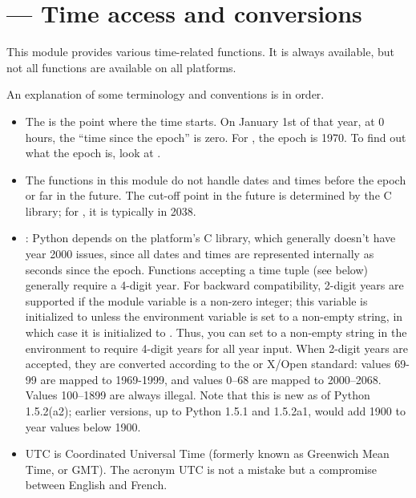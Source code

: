 \section{ ---
         Time access and conversions}



This module provides various time-related functions.
It is always available, but not all functions are available
on all platforms.

An explanation of some terminology and conventions is in order.

\begin{itemize}

\item
The  is the point where the time starts.  On
January 1st of that year, at 0 hours, the ``time since the epoch'' is
zero.  For \UNIX{}, the epoch is 1970.  To find out what the epoch is,
look at .

\item
The functions in this module do not handle dates and times before the
epoch or far in the future.  The cut-off point in the future is
determined by the C library; for \UNIX{}, it is typically in
2038.

\item
{}:  Python
depends on the platform's C library, which generally doesn't have year
2000 issues, since all dates and times are represented internally as
seconds since the epoch.  Functions accepting a time tuple (see below)
generally require a 4-digit year.  For backward compatibility, 2-digit
years are supported if the module variable  is a
non-zero integer; this variable is initialized to  unless the
environment variable  is set to a non-empty string,
in which case it is initialized to .  Thus, you can set
 to a non-empty string in the environment to require 4-digit
years for all year input.  When 2-digit years are accepted, they are
converted according to the \POSIX{} or X/Open standard: values 69-99
are mapped to 1969-1999, and values 0--68 are mapped to 2000--2068.
Values 100--1899 are always illegal.  Note that this is new as of
Python 1.5.2(a2); earlier versions, up to Python 1.5.1 and 1.5.2a1,
would add 1900 to year values below 1900.

\item
UTC is Coordinated Universal Time (formerly known as Greenwich Mean
Time, or GMT).  The acronym UTC is not a
mistake but a compromise between English and French.


\end{itemize}
